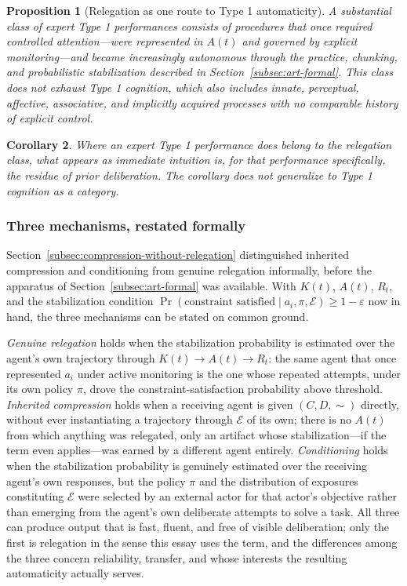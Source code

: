 \documentclass[12pt, a4paper]{article}
\theoremstyle{plain}
\newtheorem{proposition}{Proposition}[section]
\newtheorem{corollary}[proposition]{Corollary}
\theoremstyle{definition}
\theoremstyle{remark}
\begin{document}
\begin{proposition}[Relegation as one route to Type 1 automaticity]
\label{prop:s1-as-s2}
A substantial class of expert Type 1 performances consists of procedures that once required controlled attention---were represented in $A(t)$ and governed by explicit monitoring---and became increasingly autonomous through the practice, chunking, and probabilistic stabilization described in Section~\ref{subsec:art-formal}. This class does not exhaust Type 1 cognition, which also includes innate, perceptual, affective, associative, and implicitly acquired processes with no comparable history of explicit control.
\end{proposition}

\begin{corollary}
Where an expert Type 1 performance does belong to the relegation class, what appears as immediate intuition is, for that performance specifically, the residue of prior deliberation. The corollary does not generalize to Type 1 cognition as a category.
\end{corollary}

\subsubsection*{Three mechanisms, restated formally}

Section~\ref{subsec:compression-without-relegation} distinguished inherited compression and conditioning from genuine relegation informally, before the apparatus of Section~\ref{subsec:art-formal} was available. With $K(t)$, $A(t)$, $R_t$, and the stabilization condition $\Pr(\text{constraint satisfied} \mid a_i, \pi, \mathcal{E}) \geq 1-\varepsilon$ now in hand, the three mechanisms can be stated on common ground.

\emph{Genuine relegation} holds when the stabilization probability is estimated over the agent's own trajectory through $K(t) \to A(t) \to R_t$: the same agent that once represented $a_i$ under active monitoring is the one whose repeated attempts, under its own policy $\pi$, drove the constraint-satisfaction probability above threshold. \emph{Inherited compression} holds when a receiving agent is given $(C, D, \sim)$ directly, without ever instantiating a trajectory through $\mathcal{E}$ of its own; there is no $A(t)$ from which anything was relegated, only an artifact whose stabilization---if the term even applies---was earned by a different agent entirely. \emph{Conditioning} holds when the stabilization probability is genuinely estimated over the receiving agent's own responses, but the policy $\pi$ and the distribution of exposures constituting $\mathcal{E}$ were selected by an external actor for that actor's objective rather than emerging from the agent's own deliberate attempts to solve a task. All three can produce output that is fast, fluent, and free of visible deliberation; only the first is relegation in the sense this essay uses the term, and the differences among the three concern reliability, transfer, and whose interests the resulting automaticity actually serves.
\end{document}
